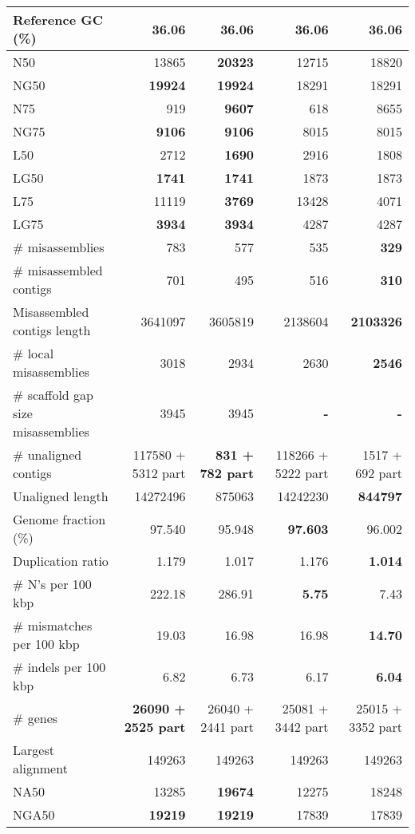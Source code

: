 \documentclass[12pt,a4paper]{article}
\begin{document}
\begin{table}[ht]
\begin{center}
\begin{tabular}{|l*{4}{|r}|}
Reference GC (\%) & 36.06 & 36.06 & 36.06 & 36.06 \\ \hline
N50 & 13865 & {\bf 20323} & 12715 & 18820 \\ \hline
NG50 & {\bf 19924} & {\bf 19924} & 18291 & 18291 \\ \hline
N75 & 919 & {\bf 9607} & 618 & 8655 \\ \hline
NG75 & {\bf 9106} & {\bf 9106} & 8015 & 8015 \\ \hline
L50 & 2712 & {\bf 1690} & 2916 & 1808 \\ \hline
LG50 & {\bf 1741} & {\bf 1741} & 1873 & 1873 \\ \hline
L75 & 11119 & {\bf 3769} & 13428 & 4071 \\ \hline
LG75 & {\bf 3934} & {\bf 3934} & 4287 & 4287 \\ \hline
\# misassemblies & 783 & 577 & 535 & {\bf 329} \\ \hline
\# misassembled contigs & 701 & 495 & 516 & {\bf 310} \\ \hline
Misassembled contigs length & 3641097 & 3605819 & 2138604 & {\bf 2103326} \\ \hline
\# local misassemblies & 3018 & 2934 & 2630 & {\bf 2546} \\ \hline
\# scaffold gap size misassemblies & 3945 & 3945 & {\bf -} & {\bf -} \\ \hline
\# unaligned contigs & 117580 + 5312 part & {\bf 831 + 782 part} & 118266 + 5222 part & 1517 + 692 part \\ \hline
Unaligned length & 14272496 & 875063 & 14242230 & {\bf 844797} \\ \hline
Genome fraction (\%) & 97.540 & 95.948 & {\bf 97.603} & 96.002 \\ \hline
Duplication ratio & 1.179 & 1.017 & 1.176 & {\bf 1.014} \\ \hline
\# N's per 100 kbp & 222.18 & 286.91 & {\bf 5.75} & 7.43 \\ \hline
\# mismatches per 100 kbp & 19.03 & 16.98 & 16.98 & {\bf 14.70} \\ \hline
\# indels per 100 kbp & 6.82 & 6.73 & 6.17 & {\bf 6.04} \\ \hline
\# genes & {\bf 26090 + 2525 part} & 26040 + 2441 part & 25081 + 3442 part & 25015 + 3352 part \\ \hline
Largest alignment & 149263 & 149263 & 149263 & 149263 \\ \hline
NA50 & 13285 & {\bf 19674} & 12275 & 18248 \\ \hline
NGA50 & {\bf 19219} & {\bf 19219} & 17839 & 17839 \\ \hline

\end{tabular}
\end{center}
\end{table}
\end{document}
